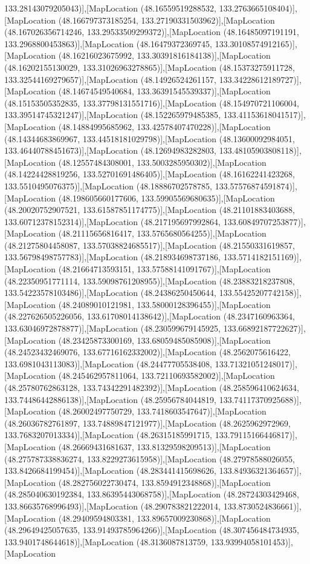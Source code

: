 133.28143079205043)],[MapLocation (48.16559519288532, 133.2763665108404)],[MapLocation (48.166797373185254, 133.27190331503962)],[MapLocation (48.167026356714246, 133.29533509299372)],[MapLocation (48.16485097191191, 133.2968800453863)],[MapLocation (48.16479372369745, 133.30108574912165)],[MapLocation (48.16216023675992, 133.30391816184138)],[MapLocation (48.16202155130029, 133.31026963278865)],[MapLocation (48.15373275911728, 133.32544169279657)],[MapLocation (48.14926524261157, 133.34228612189727)],[MapLocation (48.14674549540684, 133.36391545539337)],[MapLocation (48.15153505352835, 133.37798131551716)],[MapLocation (48.154970721106004, 133.39514745321247)],[MapLocation (48.152265979485385, 133.41153618041517)],[MapLocation (48.14884995685962, 133.42578407470228)],[MapLocation (48.14344683869967, 133.44518181029798)],[MapLocation (48.13600092984051, 133.46440788451673)],[MapLocation (48.12694983282803, 133.48105903808118)],[MapLocation (48.12557484308001, 133.5003285950302)],[MapLocation (48.14224428819256, 133.52701691486405)],[MapLocation (48.16162241423268, 133.5510495076375)],[MapLocation (48.18886702578785, 133.57576874591874)],[MapLocation (48.198605660177606, 133.59905569680635)],[MapLocation (48.20020752907521, 133.61587851174775)],[MapLocation (48.21101883403688, 133.60712378152314)],[MapLocation (48.217195697992864, 133.60849707253877)],[MapLocation (48.21115656816417, 133.5765680564255)],[MapLocation (48.21275804458087, 133.57038824685517)],[MapLocation (48.21550331619857, 133.56798498757783)],[MapLocation (48.218934698737186, 133.5714182151169)],[MapLocation (48.21664713593151, 133.57588141091767)],[MapLocation (48.22350951771114, 133.59098761208955)],[MapLocation (48.23883218237808, 133.54223578103486)],[MapLocation (48.24386250450644, 133.55425207742158)],[MapLocation (48.24089010121981, 133.58000128396455)],[MapLocation (48.227626505226056, 133.61708014138642)],[MapLocation (48.2347160963364, 133.63046972878877)],[MapLocation (48.230599679145925, 133.66892187722627)],[MapLocation (48.23425873300169, 133.68059485085908)],[MapLocation (48.24523432469076, 133.67716162332002)],[MapLocation (48.2562075616422, 133.6981043113083)],[MapLocation (48.24477705538408, 133.71321051248017)],[MapLocation (48.245462957811064, 133.72110693582002)],[MapLocation (48.25780762863128, 133.74342291482392)],[MapLocation (48.258596410624634, 133.74486442886138)],[MapLocation (48.25956784044819, 133.74117370925688)],[MapLocation (48.26002497750729, 133.7418603547647)],[MapLocation (48.26036782761897, 133.74889847121977)],[MapLocation (48.2625962972969, 133.7683207013334)],[MapLocation (48.26315185991715, 133.79115166446817)],[MapLocation (48.26669431681637, 133.81329598209513)],[MapLocation (48.275787338836274, 133.8229273615958)],[MapLocation (48.27978588026055, 133.8426684199454)],[MapLocation (48.283441415698626, 133.84936321364657)],[MapLocation (48.282756022730474, 133.8594912348868)],[MapLocation (48.285040630192384, 133.86395443068758)],[MapLocation (48.28724303429468, 133.86635768996493)],[MapLocation (48.290783821222014, 133.8730524836661)],[MapLocation (48.29409594803381, 133.89657009230868)],[MapLocation (48.29649425057635, 133.91493785964266)],[MapLocation (48.307456484734935, 133.9401748644618)],[MapLocation (48.3136087813759, 133.93994058101453)],[MapLocation 